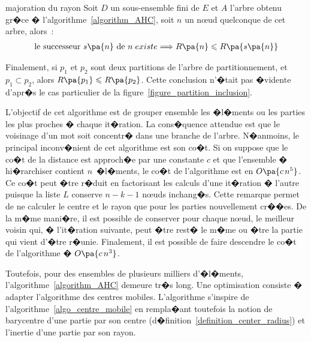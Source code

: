             \begin{xcorollary}{majoration du rayon}\label{corollary_AHC}%
            Soit $D$ un sous-ensemble fini de $E$ et $A$ l'arbre obtenu gr�ce � l'algorithme~\ref{algorithm_AHC}, 
            soit $n$ un n\oe ud quelconque de cet arbre, alors~:
                \begin{eqnarray}
                \textnormal{le successeur } s\pa{n} \text { de } n\; { existe} 
                \Longrightarrow R\pa{n} \leqslant R\pa{s\pa{n}}
                \end{eqnarray}
            \end{xcorollary}


Finalement, si $p_1$ et $p_2$ sont deux partitions de l'arbre de partitionnement, et $p_1 \subset p_2$, alors
$R\pa{p_1} \leqslant R\pa{p_2}$. Cette conclusion n'�tait pas �vidente d'apr�s le cas particulier de la figure~\ref{figure_partition_inclusion}. 





L'objectif de cet algorithme est de grouper ensemble les �l�ments ou les parties les plus proches � chaque it�ration. La cons�quence attendue est que le voisinage d'un mot soit concentr� dans une branche de l'arbre. N�anmoins, le principal inconv�nient de cet algorithme est son co�t. Si on suppose que le co�t de la distance est approch�e par une constante $c$ et que l'ensemble � hi�rarchiser contient $n$~�l�ments, le co�t de l'algorithme est en $O\pa{c\,n^5}$. Ce co�t peut �tre r�duit en factorisant les calculs d'une it�ration � l'autre puisque la liste $L$ conserve $n-k-1$ n\oe uds inchang�s. Cette remarque permet de ne calculer le centre et le rayon que pour les parties nouvellement cr��es. De la m�me mani�re, il est possible de conserver pour chaque n\oe ud, le meilleur voisin qui, � l'it�ration suivante, peut �tre rest� le m�me ou �tre la partie qui vient d'�tre r�unie. Finalement, il est possible de faire descendre le co�t de l'algorithme � $O\pa{c \, n^3}$.

Toutefois, pour des ensembles de plusieurs milliers d'�l�ments, l'algorithme~\ref{algorithm_AHC} demeure tr�s long. Une optimisation consiste � adapter l'algorithme des centres mobiles. L'algorithme s'inspire de l'algorithme~\ref{algo_centre_mobile} en rempla�ant toutefois la notion de barycentre d'une partie par son centre (d�finition~\ref{definition_center_radius}) et l'inertie d'une partie par son rayon.


